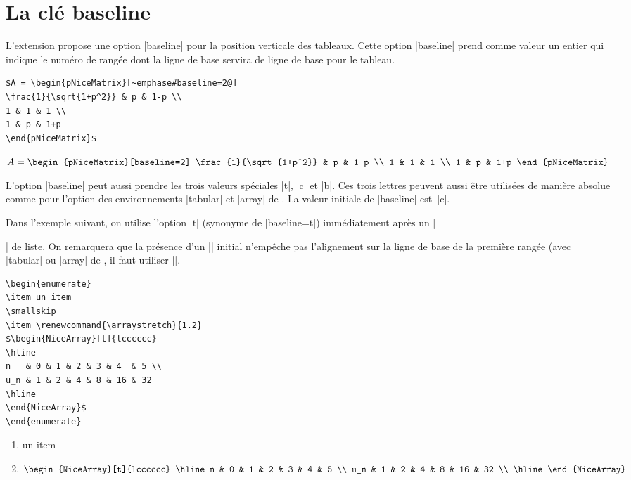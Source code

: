 \documentclass[dvipsnames]{article}%
\def\interitem{\vspace{7mm plus 2 mm minus 3mm}}
\begin{document}
\bigskip
\section{La clé baseline}

L'extension  propose une option |baseline| pour la position
verticale des tableaux. Cette option |baseline| prend comme valeur un entier qui
indique le numéro de rangée dont la ligne de base servira de ligne de base pour
le tableau.

\medskip
\begin{BVerbatim}[baseline=c,boxwidth=9cm]
$A = \begin{pNiceMatrix}[~emphase#baseline=2@]
\frac{1}{\sqrt{1+p^2}} & p & 1-p \\
1 & 1 & 1 \\
1 & p & 1+p
\end{pNiceMatrix}$
\end{BVerbatim}
$A = \begin{pNiceMatrix}[baseline=2]
\frac{1}{\sqrt{1+p^2}} & p & 1-p \\
1 & 1 & 1 \\
1 & p & 1+p
\end{pNiceMatrix}$


\interitem L'option |baseline| peut aussi prendre les trois valeurs spéciales
|t|, |c| et |b|. Ces trois lettres peuvent aussi être utilisées de manière
absolue comme pour l'option des environnements |{tabular}| et |{array}| de
. La valeur initiale de |baseline| est~|c|.


\bigskip
Dans l'exemple suivant, on utilise l'option |t| (synonyme de |baseline=t|)
immédiatement après un |\item| de liste. On remarquera que la présence d'un
|\hline| initial n'empêche pas l'alignement sur la ligne de base de la première
rangée (avec |{tabular}| ou |{array}| de , il faut utiliser
|\firsthline|.

\smallskip
\begin{BVerbatim}[baseline=c,boxwidth=9cm]
\begin{enumerate}
\item un item
\smallskip
\item \renewcommand{\arraystretch}{1.2}
$\begin{NiceArray}[t]{lcccccc}
\hline
n   & 0 & 1 & 2 & 3 & 4  & 5 \\
u_n & 1 & 2 & 4 & 8 & 16 & 32 
\hline
\end{NiceArray}$
\end{enumerate}
\end{BVerbatim}
%
\begin{minipage}{5cm}
\begin{enumerate}
\item un item
\smallskip
\item \renewcommand{\arraystretch}{1.2}
$\begin{NiceArray}[t]{lcccccc}
\hline
n   & 0 & 1 & 2 & 3 & 4  & 5  \\
u_n & 1 & 2 & 4 & 8 & 16 & 32 \\
\hline
\end{NiceArray}$
\end{enumerate}
\end{minipage}
\end{document}
